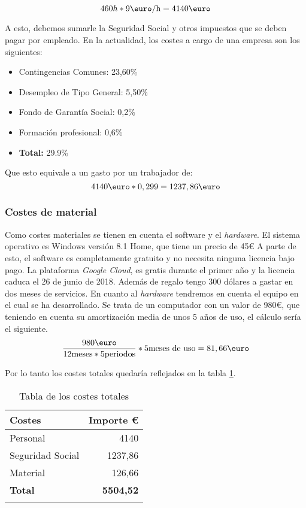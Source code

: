 \[ 460h * 9\textrm{\euro/h} = 4140\textrm{\euro}\]

A esto, debemos sumarle la Seguridad Social y otros impuestos que se deben pagar por empleado. En la actualidad, los costes a cargo de una empresa son los siguientes:

\begin{itemize}
\item Contingencias Comunes: 23,60\%
\item Desempleo de Tipo General: 5,50\%
\item Fondo de Garantía Social: 0,2\%
\item Formación profesional: 0,6\%
\item \textbf{Total:} 29.9\%
\end{itemize}

Que esto equivale a un gasto por un trabajador de: 
\[ 4140\textrm{\euro} * 0,299 = 1237,86\textrm{\euro}\]
\subsubsection{Costes de material}

Como costes materiales se tienen en cuenta el software y el \emph{hardware}. El sistema operativo es Windows versión 8.1 Home, que tiene un precio de 45\euro{} A parte de esto, el software es completamente gratuito y no necesita ninguna licencia bajo pago. La plataforma \emph{Google Cloud}, es gratis durante el primer año y la licencia caduca el 26 de junio de 2018. Además de regalo tengo 300 dólares a gastar en dos meses de servicios. En cuanto al \emph{hardware} tendremos en cuenta el equipo en el cual se ha desarrollado. Se trata de un computador con un valor de 980\euro, que teniendo en cuenta su amortización media de unos 5 años de uso, el cálculo sería el siguiente. 
\[ \frac{980\textrm{\euro}}{12\textrm{meses} * 5 \textrm{periodos}} *5\textrm{meses de uso} = 81,66\textrm{\euro}\]
 
Por lo tanto los costes totales quedaría reflejados en la tabla \ref{tab:costes}.

\begin{table}[]
\centering
{}
\begin{tabular}{p{4cm} r}
\toprule
Costes & Importe \euro{} \\ \midrule
Personal         & 4140   \\ 
Seguridad Social & 1237,86 \\ 
Material         & 126,66  \\ 
\textbf{Total}   & \textbf{5504,52} \\ \bottomrule
\caption{Tabla de los costes totales}
\label{tab:costes}

\end{tabular}
\end{table}

